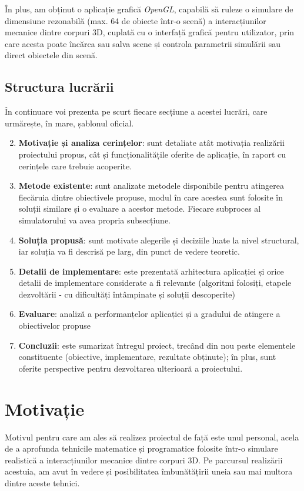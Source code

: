 \documentclass[12pt,a4paper]{report}
\begin{document}
În plus, am obținut o aplicație grafică \textit{OpenGL}, capabilă să ruleze o simulare de dimensiune rezonabilă (max. 64 de obiecte într-o scenă) a interacțiunilor mecanice dintre corpuri 3D, cuplată cu o interfață grafică pentru utilizator, prin care acesta poate încărca sau salva scene și controla parametrii simulării sau direct obiectele din scenă.
 
\section{Structura lucrării}
În continuare voi prezenta pe scurt fiecare secțiune a acestei lucrări, care urmărește, în mare, șablonul oficial.
\begin{enumerate}
	\setcounter{enumi}{1}
	\item \textbf{Motivație și analiza cerințelor}: sunt detaliate atât motivația realizării proiectului propus, cât și funcționalitățile oferite de aplicație, în raport cu cerințele care trebuie acoperite.
	\item \textbf{Metode existente}: sunt analizate metodele disponibile pentru atingerea fiecăruia dintre obiectivele propuse, modul în care acestea sunt folosite în soluții similare și o evaluare a acestor metode. Fiecare subproces al simulatorului va avea propria subsecțiune.
	\item \textbf{Soluția propusă}: sunt motivate alegerile și deciziile luate la nivel structural, iar soluția va fi descrisă pe larg, din punct de vedere teoretic.
	\item \textbf{Detalii de implementare}: este prezentată arhitectura aplicației și orice detalii de implementare considerate a fi relevante (algoritmi folosiți, etapele dezvoltării - cu dificultăți întâmpinate și soluții descoperite)
	\item \textbf{Evaluare}: analiză a performanțelor aplicației și a gradului de atingere a obiectivelor propuse
	\item \textbf{Concluzii}: este sumarizat întregul proiect, trecând din nou peste elementele constituente (obiective, implementare, rezultate obținute); în plus, sunt oferite perspective pentru dezvoltarea ulterioară a proiectului.
\end{enumerate}



\chapter{Motivație}
Motivul pentru care am ales să realizez proiectul de față este unul personal, acela de a aprofunda tehnicile matematice și programatice folosite într-o simulare realistică a interacțiunilor mecanice dintre corpuri 3D. Pe parcursul realizării acestuia, am avut în vedere și posibilitatea îmbunătățirii uneia sau mai multora dintre aceste tehnici.
\end{document}
